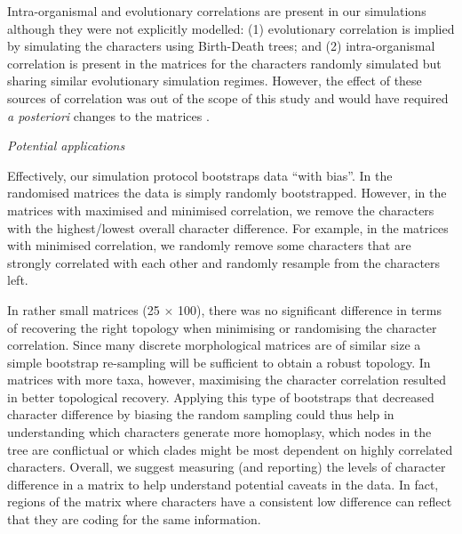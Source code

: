 \documentclass[12pt,letterpaper]{article}
\renewcommand{\subsection}[1]{%
\bigskip
\begin{center}
\begin{large}
\normalfont\itshape #1
\end{large}
\end{center}}
\begin{document}
Intra-organismal and evolutionary correlations are present in our simulations although they were not explicitly modelled:
(1) evolutionary correlation is implied by simulating the characters using Birth-Death trees;
and (2) intra-organismal correlation is present in the matrices for the characters randomly simulated but sharing similar evolutionary simulation regimes.
However, the effect of these sources of correlation was out of the scope of this study and would have required \textit{a posteriori} changes to the matrices \citep{Lande1983,Maddison1990,Pagel1994}.

\subsection{Potential applications}
Effectively, our simulation protocol bootstraps data ``with bias''.
In the randomised matrices the data is simply randomly bootstrapped.
However, in the matrices with maximised and minimised correlation, we remove the characters with the highest/lowest overall character difference.
For example, in the matrices with minimised correlation, we randomly remove some characters that are strongly correlated with each other and randomly resample from the characters left.

In rather small matrices (25 $\times$ 100), there was no significant difference in terms of recovering the right topology when minimising or randomising the character correlation.
Since many discrete morphological matrices are of similar size \citep{guillerme2016assessment} a simple bootstrap re-sampling will be sufficient to obtain a robust topology.
In matrices with more taxa, however, maximising the character correlation resulted in better topological recovery.
Applying this type of bootstraps that decreased character difference by biasing the random sampling could thus help in understanding which characters generate more homoplasy, which nodes in the tree are conflictual or which clades might be most dependent on highly correlated characters. 
Overall, we suggest measuring (and reporting) the levels of character difference in a matrix to help understand potential caveats in the data.
In fact, regions of the matrix where characters have a consistent low difference can reflect that they are coding for the same information.
\end{document}
